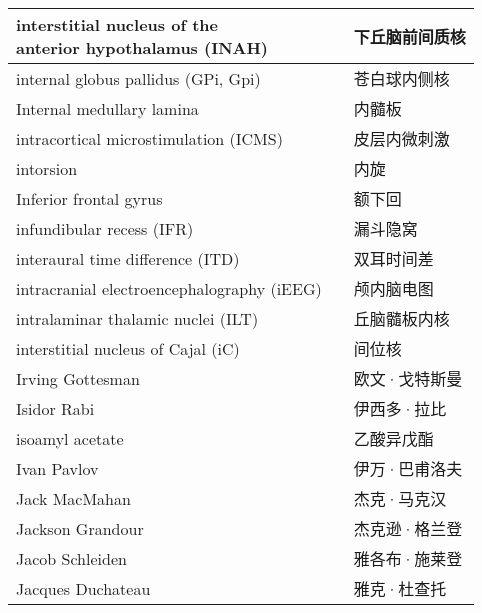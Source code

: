 \begin{longtable}{lll}
	\midrule
	\makecell[l]{interstitial nucleus of the \\anterior hypothalamus  (INAH)} && 下丘脑前间质核  \\
	
	\midrule
	internal globus pallidus (GPi, Gpi)  && 苍白球内侧核  \\
	
	\midrule
	Internal medullary lamina  && 内髓板  \\
	
	\midrule
	intracortical microstimulation (ICMS)  && 皮层内微刺激  \\
	
	\midrule
	intorsion   && 内旋  \\
	
	\midrule
	Inferior frontal gyrus   && 额下回  \\
	
	\midrule
	infundibular recess (IFR)   && 漏斗隐窝  \\
	
	\midrule
	interaural time difference (ITD)   && 双耳时间差  \\
	
	\midrule
	intracranial electroencephalography (iEEG)  && 颅内脑电图  \\
	
	\midrule
	intralaminar thalamic nuclei (ILT)  && 丘脑髓板内核  \\
	
	\midrule
	interstitial nucleus of Cajal (iC)   && 间位核  \\
	
	\midrule
	Irving Gottesman   && 欧文·戈特斯曼  \\
	
	\midrule
	Isidor Rabi   && 伊西多·拉比  \\
	
	\midrule
	isoamyl acetate   && 乙酸异戊酯  \\
	
	\midrule
	Ivan Pavlov   && 伊万·巴甫洛夫  \\
	
	\midrule
	Jack MacMahan   && 杰克·马克汉  \\
	
	\midrule
	Jackson Grandour   && 杰克逊·格兰登  \\
	
	\midrule
	Jacob Schleiden   && 雅各布·施莱登  \\
	
	\midrule
	Jacques Duchateau   && 雅克·杜查托  \\
	

\end{longtable}
